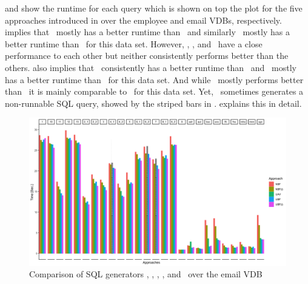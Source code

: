  and  show the runtime for each query which is shown on top the plot
for the five approaches introduced in  over the employee and email VDBs, respectively.
%
 implies that  \nbf\ mostly has a better
runtime than \nbfi\ and similarly \ubf\ mostly has a better runtime than \ubfi\ for this data set. However, 
\nbf, \uav, and \ubf\ have a close performance to each other but neither consistently performs 
better than the others. 
%
%
 also implies that \nbf\ consistently has a better
runtime than \nbfi\ and \ubf\ mostly has a better runtime than \ubfi\ for this data set. And while
\uav\ mostly performs better than \nbf\ it is mainly comparable to \ubf\ for this data set. Yet, \uav\
sometimes generates a non-runnable SQL query, showed by the striped bars in .
\exref{uav-fail} explains this in detail. 


\begin{figure}[!t]
\centering
\includegraphics[width = \linewidth] {figs/plots/enron1-5.png}
\caption[Comparison of SQL generators \nbf, \nbfi, \uav, \ubf, and \ubfi\ over the email VDB]{Comparison of SQL generators \nbf, \nbfi, \uav, \ubf, and \ubfi\ over the email VDB}
\label{fig:enron1-5}
\end{figure}


